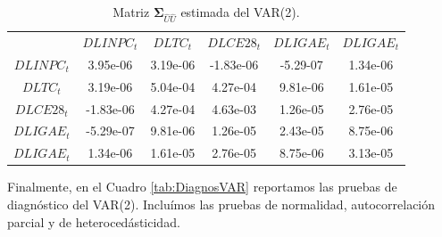 \documentclass[
]{book}
\begin{document}
\begin{longtable}[]{@{}cccccc@{}}
\caption{\label{tab:SigmaVARp} Matriz \(\mathbf{\Sigma}_{\hat{U}\hat{U}}\) estimada del VAR(2).}\tabularnewline
\toprule\noalign{}
\endfirsthead
\endhead
\bottomrule\noalign{}
\endlastfoot
& \(DLINPC_t\) & \(DLTC_t\) & \(DLCE28_t\) & \(DLIGAE_t\) & \(DLIGAE_t\) \\
\(DLINPC_t\) & 3.95e-06 & 3.19e-06 & -1.83e-06 & -5.29-07 & 1.34e-06 \\
\(DLTC_t\) & 3.19e-06 & 5.04e-04 & 4.27e-04 & 9.81e-06 & 1.61e-05 \\
\(DLCE28_t\) & -1.83e-06 & 4.27e-04 & 4.63e-03 & 1.26e-05 & 2.76e-05 \\
\(DLIGAE_t\) & -5.29e-07 & 9.81e-06 & 1.26e-05 & 2.43e-05 & 8.75e-06 \\
\(DLIGAE_t\) & 1.34e-06 & 1.61e-05 & 2.76e-05 & 8.75e-06 & 3.13e-05 \\
\end{longtable}

Finalmente, en el Cuadro \ref{tab:DiagnosVAR} reportamos las pruebas de diagnóstico del VAR(2). Incluímos las pruebas de normalidad, autocorrelación parcial y de heterocedásticidad.
\end{document}
